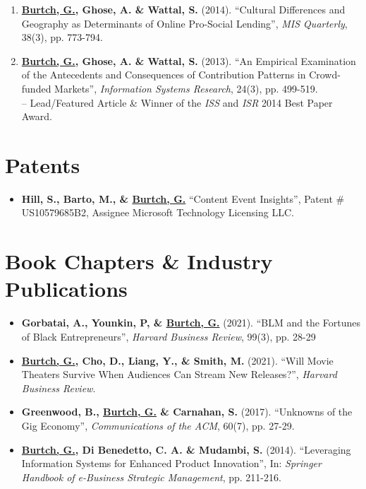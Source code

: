 \documentclass[10.5pt,letterpaper,sans]{moderncv}        %
\begin{document}
\begin{enumerate}[leftmargin=!,labelindent=5pt,itemindent=-15pt]
\item \textbf{\underline{Burtch, G.}, Ghose, A. \& Wattal, S.} (2014). ``Cultural Differences and Geography as Determinants of Online Pro-Social Lending'', \textit{MIS Quarterly}, 38(3), pp. 773-794.

\item \textbf{\underline{Burtch, G.}, Ghose, A. \& Wattal, S.} (2013). ``An Empirical Examination of the Antecedents and Consequences of Contribution Patterns in Crowd-funded Markets'', \textit{Information Systems Research}, 24(3), pp. 499-519. \\-- Lead/Featured Article \& Winner of the \textit{ISS} and \textit{ISR} 2014 Best Paper Award.

\end{enumerate}

\section{Patents}

\begin{itemize}[leftmargin=!,labelindent=5pt,itemindent=-15pt]

\item \textbf{Hill, S., Barto, M., \& \underline{Burtch, G.}} ``Content Event Insights'', Patent \# US10579685B2, Assignee\: Microsoft Technology Licensing LLC.

\end{itemize}

\vspace{4 pt}

\section{Book Chapters \& Industry Publications}

\smallskip

\begin{itemize}[leftmargin=!,labelindent=5pt,itemindent=-15pt]

\item \textbf{Gorbatai, A., Younkin, P, \& \underline{Burtch, G.}} (2021). ``BLM and the Fortunes of Black Entrepreneurs'', \textit{Harvard Business Review}, 99(3), pp. 28-29

\item \textbf{\underline{Burtch, G.}, Cho, D., Liang, Y., \& Smith, M.} (2021). ``Will Movie Theaters Survive When Audiences Can Stream New Releases?'', \textit{Harvard Business Review}.

\item \textbf{Greenwood, B., \underline{Burtch, G.} \& Carnahan, S.} (2017). ``Unknowns of the Gig Economy'', \textit{Communications of the ACM}, 60(7), pp. 27-29.

\item \textbf{\underline{Burtch, G.}, Di Benedetto, C. A. \& Mudambi, S.} (2014). ``Leveraging Information Systems for Enhanced Product Innovation'', In: \textit{Springer Handbook of e-Business Strategic Management}, pp. 211-216.

\end{itemize}
\end{document}
